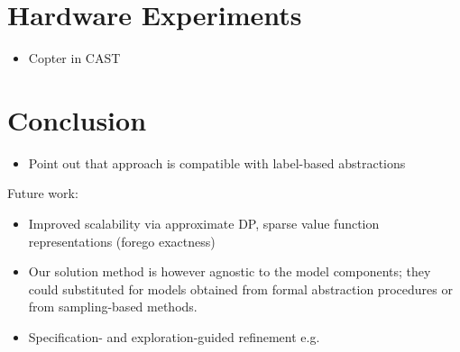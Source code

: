 \documentclass[conference]{IEEEtran}
\renewcommand{\cite}[1]{\citep{#1}}
\begin{document}

\section{Hardware Experiments}
\label{sec:hardware}

\begin{itemize}
    \item Copter in CAST
\end{itemize}


\section{Conclusion}
\label{sec:conclusion}

\begin{itemize}
	\item Point out that approach is compatible with label-based abstractions
\end{itemize}

Future work:
\begin{itemize}
	\item Improved scalability via approximate DP, sparse value function representations (forego exactness)
	\item Our solution method is however agnostic to the model components; they could substituted for models obtained from formal abstraction procedures or from sampling-based methods. 
  \item Specification- and exploration-guided refinement e.g. \cite{Nilsson2017}
\end{itemize}

 

 
\end{document}
